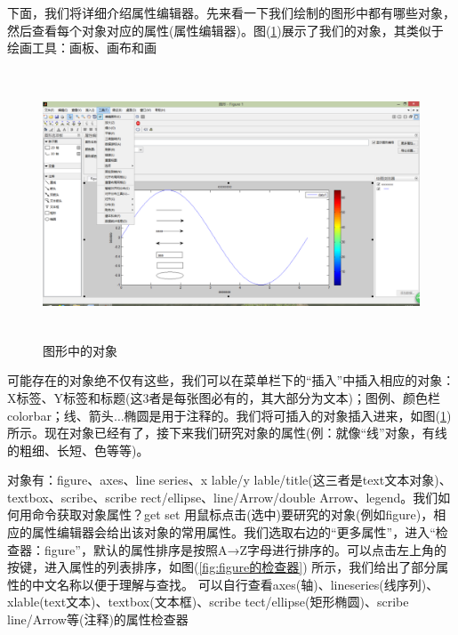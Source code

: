         下面，我们将详细介绍属性编辑器。先来看一下我们绘制的图形中都有哪些对象，然后查看每个对象对应的属性(属性编辑器)。图(\ref{图形中的对象})展示了我们的对象，其类似于绘画工具：画板、画布和画
        \begin{figure}[H]
        \centering
        \includegraphics[height=8cm]{images/24.jpg}
        \caption{图形中的对象}
        \label{图形中的对象}
        \end{figure}
        \par
        可能存在的对象绝不仅有这些，我们可以在菜单栏下的“插入”中插入相应的对象：X标签、Y标签和标题(这3者是每张图必有的，其大部分为文本)；图例、颜色栏colorbar；线、箭头$\dots$椭圆是用于注释的。我们将可插入的对象插入进来，如图(\ref{图形中的对象})所示。现在对象已经有了，接下来我们研究对象的属性(例：就像“线”对象，有线的粗细、长短、色等等)。
        \par
        对象有：figure、axes、line series、x lable/y lable/title(这三者是text文本对象)、textbox、scribe、scribe rect/ellipse、line/Arrow/double Arrow、legend。我们如何用命令获取对象属性？get set 用鼠标点击(选中)要研究的对象(例如figure)，相应的属性编辑器会给出该对象的常用属性。我们选取右边的“更多属性”，进入“检查器：figure”，默认的属性排序是按照A→Z字母进行排序的。可以点击左上角的按键，进入属性的列表排序，如图(\ref{fig:figure的检查器}) 所示，我们给出了部分属性的中文名称以便于理解与查找。
        可以自行查看axes(轴)、lineseries(线序列)、xlable(text文本)、textbox(文本框)、scribe tect/ellipse(矩形椭圆)、scribe line/Arrow等(注释)的属性检查器
